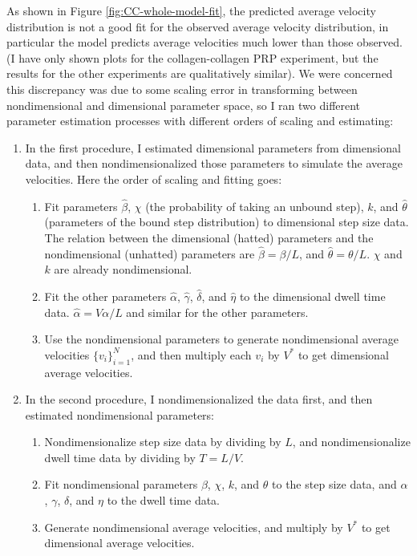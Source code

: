 \documentclass{article}
\begin{document}
As shown in Figure \ref{fig:CC-whole-model-fit}, the predicted average
velocity distribution is not a good fit for the observed average
velocity distribution, in particular the model predicts average
velocities much lower than those observed. (I have only shown plots
for the collagen-collagen PRP experiment, but the results for the
other experiments are qualitatively similar). We were concerned this
discrepancy was due to some scaling error in transforming between
nondimensional and dimensional parameter space, so I ran two different
parameter estimation processes with different orders of scaling and
estimating:
\begin{enumerate}
\item In the first procedure, I estimated dimensional parameters from
  dimensional data, and then nondimensionalized those parameters to
  simulate the average velocities. Here the order of scaling and
  fitting goes:
  \begin{enumerate}
  \item Fit parameters $\hat{\beta}$, $\chi$ (the probability of
    taking an unbound step), $k$, and $\hat{\theta}$ (parameters of
    the bound step distribution) to dimensional step size data. The
    relation between the dimensional (hatted) parameters and the
    nondimensional (unhatted) parameters are
    $\hat{\beta} = \beta / L$, and $\hat{\theta} = \theta / L$. $\chi$
    and $k$ are already nondimensional.
  \item Fit the other parameters $\hat{\alpha}$, $\hat{\gamma}$,
    $\hat{\delta}$, and $\hat{\eta}$ to the dimensional dwell time
    data. $\hat{\alpha} = V \alpha / L$ and similar for the other
    parameters.
  \item Use the nondimensional parameters to generate nondimensional
    average velocities $\{v_i\}_{i=1}^{N}$, and then multiply each
    $v_i$ by $V^*$ to get dimensional average velocities.
  \end{enumerate}
\item In the second procedure, I nondimensionalized the data first,
  and then estimated nondimensional parameters:
  \begin{enumerate}
  \item Nondimensionalize step size data by dividing by $L$, and
    nondimensionalize dwell time data by dividing by $T = L/V$.
  \item Fit nondimensional parameters $\beta$, $\chi$, $k$, and
    $\theta$ to the step size data, and $\alpha$, $\gamma$, $\delta$,
    and $\eta$ to the dwell time data. 
  \item Generate nondimensional average velocities, and multiply by
    $V^*$ to get dimensional average velocities.
  \end{enumerate}
\end{enumerate}
\end{document}
